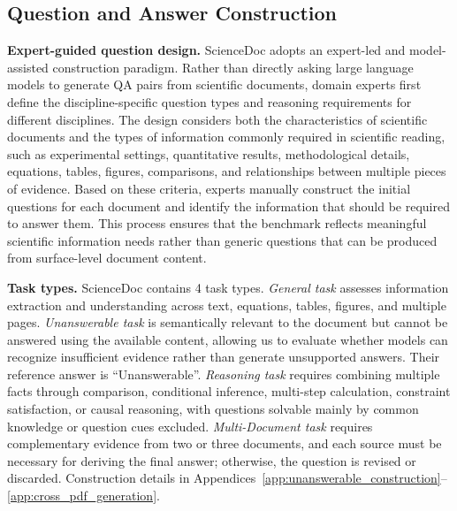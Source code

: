 \documentclass{article} %
\begin{document}
\subsection{Question and Answer Construction}

\textbf{Expert-guided question design.} ScienceDoc adopts an expert-led and model-assisted construction paradigm. Rather than directly asking large language models to generate QA pairs from scientific documents, domain experts first define the discipline-specific question types and reasoning requirements for different disciplines. The design considers both the characteristics of scientific documents and the types of information commonly required in scientific reading, such as experimental settings, quantitative results, methodological details, equations, tables, figures, comparisons, and relationships between multiple pieces of evidence. Based on these criteria, experts manually construct the initial questions for each document and identify the information that should be required to answer them. This process ensures that the benchmark reflects meaningful scientific information needs rather than generic questions that can be produced from surface-level document content.


\textbf{Task types.} ScienceDoc contains 4 task types. \textit{General task} assesses information extraction and understanding across text, equations, tables, figures, and multiple pages. \textit{Unanswerable task} is semantically relevant to the document but cannot be answered using the available content, allowing us to evaluate whether models can recognize insufficient evidence rather than generate unsupported answers. Their reference answer is ``Unanswerable''. \textit{Reasoning task} requires combining multiple facts through comparison, conditional inference, multi-step calculation, constraint satisfaction, or causal reasoning, with questions solvable mainly by common knowledge or question cues excluded. \textit{Multi-Document task} requires complementary evidence from two or three documents, and each source must be necessary for deriving the final answer; otherwise, the question is revised or discarded. Construction details in Appendices~\ref{app:unanswerable_construction}--\ref{app:cross_pdf_generation}.
\end{document}
